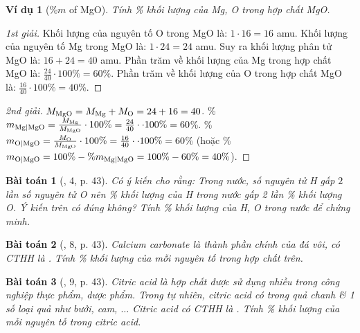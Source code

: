 \documentclass{article}
\newtheorem{baitoan}{Bài toán}
\newtheorem{vidu}{Ví dụ}
\begin{document}
\begin{vidu}[\%$m$ of MgO]
	Tính \% khối lượng của \emph{Mg, O} trong hợp chất \emph{MgO}.
\end{vidu}

\begin{proof}[1st giải]
	Khối lượng của nguyên tố O trong MgO là: $1\cdot16 = 16$ amu. Khối lượng của nguyên tố Mg trong MgO là: $1\cdot24 = 24$ amu. Suy ra khối lượng phân tử MgO là: $16 + 24 = 40$ amu. Phần trăm về khối lượng của Mg trong hợp chất MgO là: $\frac{24}{40}\cdot100\% = 60$\%. Phần trăm về khối lượng của O trong hợp chất MgO là: $\frac{16}{40}\cdot100\% = 40$\%.
\end{proof}

\begin{proof}[2nd giải]
	$M_{\rm MgO} = M_{\rm Mg} + M_{\rm O} = 24 + 16 = 40$. \%$m_{\rm Mg|MgO} = \frac{M_{\rm Mg}}{M_{\rm MgO}}\cdot100\% = \frac{24}{40}\cdot\cdot100\% = 60$\%. \%$m_{\rm O|MgO} = \frac{M_{\rm O}}{M_{\rm MgO}}\cdot100\% = \frac{16}{40}\cdot\cdot100\% = 60$\% (hoặc \%$m_{\rm O|MgO} = 100\% - \%m_{\rm Mg|MgO} = 100\% - 60\% = 40\%$).
\end{proof}

\begin{baitoan}[\cite{SGK_KHTN_7_Canh_Dieu}, 4, p. 43]
	Có ý kiến cho rằng: Trong nước, số nguyên tử \emph{H} gấp $2$ lần số nguyên tử \emph{O} nên \% khối lượng của \emph{H} trong nước gấp 2 lần \% khối lượng \emph{O}. Ý kiến trên có đúng không? Tính \% khối lượng của \emph{H, O} trong nước để chứng minh.
\end{baitoan}

\begin{baitoan}[\cite{SGK_KHTN_7_Canh_Dieu}, 8, p. 43]
	Calcium carbonate là thành phần chính của đá vôi, có CTHH là \emph{}. Tính \% khối lượng của mỗi nguyên tố trong hợp chất trên.
\end{baitoan}

\begin{baitoan}[\cite{SGK_KHTN_7_Canh_Dieu}, 9, p. 43]
	Citric acid là hợp chất được sử dụng nhiều trong công nghiệp thực phẩm, dược phẩm. Trong tự nhiên, citric acid có trong quả chanh \& 1 số loại quả như bưởi, cam, $\ldots$  Citric acid có CTHH là \emph{}. Tính \% khối lượng của mỗi nguyên tố trong citric acid.
\end{baitoan}
\end{document}
